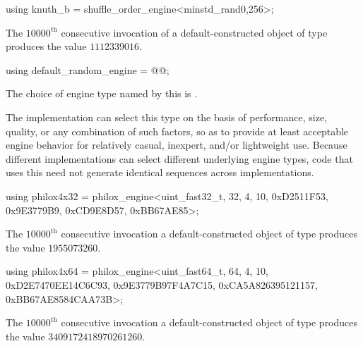 %
\begin{itemdecl}
using knuth_b = shuffle_order_engine<minstd_rand0,256>;
\end{itemdecl}

\begin{itemdescr}
\pnum
\required
 The $10000^\text{th}$ consecutive invocation
 of a default-constructed object
 of type 
 produces the value $1112339016$.
\end{itemdescr}%

%
\begin{itemdecl}
using default_random_engine = @\textit{}@;
\end{itemdecl}

\begin{itemdescr}
\pnum
\remarks
The choice of engine type
named by this 
is .
\begin{note}
 The implementation
 can select this type
 on the basis of performance,
 size,
 quality,
 or any combination of such factors,
 so as to provide at least acceptable engine behavior
 for relatively casual, inexpert, and/or lightweight use.
 Because different implementations
 can select different underlying engine types,
 code that uses this 
 need not generate identical sequences across implementations.
\end{note}
\end{itemdescr}%

%
\begin{itemdecl}
using philox4x32 =
      philox_engine<uint_fast32_t, 32, 4, 10,
       0xD2511F53, 0x9E3779B9, 0xCD9E8D57, 0xBB67AE85>;
\end{itemdecl}

\begin{itemdescr}
\pnum
\required
The $10000^\text{th}$ consecutive invocation
a default-constructed object of type 
produces the value $1955073260$.
\end{itemdescr}%

%
\begin{itemdecl}
using philox4x64 =
      philox_engine<uint_fast64_t, 64, 4, 10,
       0xD2E7470EE14C6C93, 0x9E3779B97F4A7C15, 0xCA5A826395121157, 0xBB67AE8584CAA73B>;
\end{itemdecl}

\begin{itemdescr}
\pnum
\required
The $10000^\text{th}$ consecutive invocation
a default-constructed object of type 
produces the value $3409172418970261260$.
\end{itemdescr}%
%
%


